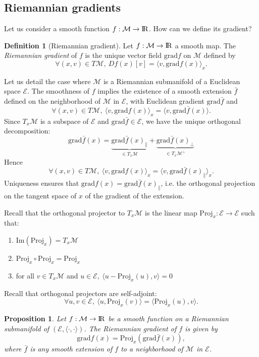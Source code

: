 \documentclass[10pt,a4paper]{book}
\theoremstyle{definition}
\newtheorem{defn}{Definition}[section]
\theoremstyle{plain}
\newtheorem{prop}{Proposition}[section]
\theoremstyle{remark}
\newcommand{\grad}{\textrm{grad}}
\newcommand{\E}{\mathcal{E}}
\newcommand \M {\mathcal{M}}
\def\R{{\rm I\kern-0.16em R}}
\begin{document}
\subsection{Riemannian gradients}
Let us consider a smooth function $f:\M \to \R$. How can we define its gradient?

\begin{defn}[Riemannian gradient]
Let $f:\M \to \R$ a smooth map. The \emph{Riemannian gradient} of $f$ is the unique vector field $\grad f$ on $\M$ defined by
$$\forall (x,v)\in T\M,~Df(x)[v]=\langle v,\grad f(x)\rangle_x.$$
\end{defn}
Let us detail the case where $\M$ is a Riemannian submanifold of a Euclidean space $\E$. The smoothness of $f$ implies the existence of a smooth extension $\bar{f}$ defined on the neighborhood of $\M$ in $\E$, with Euclidean gradient $\grad \bar{f}$ and
$$\forall (x,v)\in T\M,~\langle v,\grad f(x)\rangle_x=\langle v,\grad \bar{f}(x)\rangle.$$
Since $T_x\M$ is a subspace of $\E$ and $\grad \bar{f}\in \E$, we have the unique orthogonal decomposition:
$$\grad \bar{f}(x)=\underbrace{\grad \bar{f}(x)_{\|}}_{\in T_x\M}+\underbrace{\grad \bar{f}(x)_{\bot}}_{\in T_x\M^{\bot}}$$
Hence 
$$\forall (x,v)\in T\M,~\langle v,\grad f(x)\rangle_x=\langle v,\grad \bar{f}(x)_{\|}\rangle_x.$$
Uniqueness ensures that $\grad f(x)=\grad \bar{f}(x)_{\|}$, i.e. the orthogonal projection on the tangent space of $x$ of the gradient of the extension.
\par \medskip
Recall that the orthogonal projector to $T_x\M$ is the linear map $\text{Proj}_x:\E \to \E$ such that:
\begin{enumerate}
\item $\text{Im}(\text{Proj}_x)=T_x\M$
\item $\text{Proj}_x\circ\text{Proj}_x=\text{Proj}_x$
\item for all $v\in T_x\M$ and $u\in \E,~\langle u-\text{Proj}_x(u),v\rangle =0$
\end{enumerate}
Recall that orthogonal projectors are self-adjoint:
$$\forall u,v\in \E,~\langle u,\text{Proj}_x(v)\rangle=\langle \text{Proj}_x(u),v\rangle.$$
\begin{prop}
Let $f:\M\to \R$ be a smooth function on a Riemannian submanifold of $(\E,\langle\cdot,\cdot\rangle)$. The Riemannian gradient of $f$ is given by
$$\grad f(x)=\text{Proj}_x(\grad \bar{f}(x)),$$
where $\bar{f}$ is any smooth extension of $f$ to a neighborhood of $\M$ in $\E$. 
\end{prop}
\end{document}
